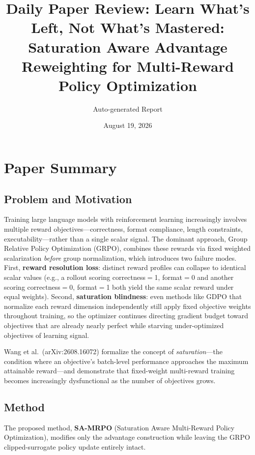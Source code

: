 \documentclass[11pt,a4paper]{article}
\title{Daily Paper Review: Learn What's Left, Not What's Mastered: Saturation Aware Advantage Reweighting for Multi-Reward Policy Optimization}
\author{Auto-generated Report}
\date{August 19, 2026}
\begin{document}
\maketitle

\section{Paper Summary}

\subsection{Problem and Motivation}
Training large language models with reinforcement learning increasingly involves multiple reward objectives---correctness, format compliance, length constraints, executability---rather than a single scalar signal. The dominant approach, Group Relative Policy Optimization (GRPO), combines these rewards via fixed weighted scalarization \emph{before} group normalization, which introduces two failure modes. First, \textbf{reward resolution loss}: distinct reward profiles can collapse to identical scalar values (e.g., a rollout scoring correctness$=$1, format$=$0 and another scoring correctness$=$0, format$=$1 both yield the same scalar reward under equal weights). Second, \textbf{saturation blindness}: even methods like GDPO that normalize each reward dimension independently still apply fixed objective weights throughout training, so the optimizer continues directing gradient budget toward objectives that are already nearly perfect while starving under-optimized objectives of learning signal.

Wang et al.\ (arXiv:2608.16072) formalize the concept of \emph{saturation}---the condition where an objective's batch-level performance approaches the maximum attainable reward---and demonstrate that fixed-weight multi-reward training becomes increasingly dysfunctional as the number of objectives grows.

\subsection{Method}
The proposed method, \textbf{SA-MRPO} (Saturation Aware Multi-Reward Policy Optimization), modifies only the advantage construction while leaving the GRPO clipped-surrogate policy update entirely intact.
\end{document}
